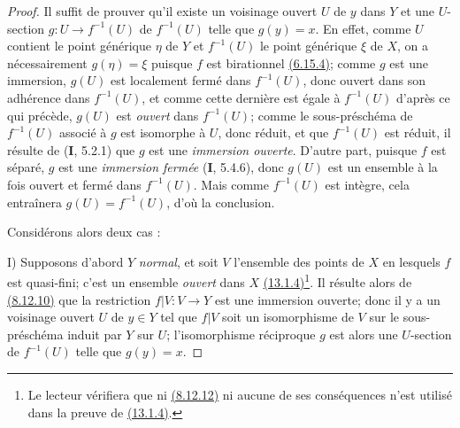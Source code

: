 \begin{proof}
Il suffit de prouver qu'il existe un voisinage ouvert $U$ de $y$ dans
$Y$ et une $U$-section $g:U\to f^{-1}(U)$ de $f^{-1}(U)$ telle que
$g(y)=x$. En effet, comme $U$ contient le point générique $\eta$ de
$Y$ et $f^{-1}(U)$ le point générique $\xi$ de $X$, on a
nécessairement $g(\eta)=\xi$ puisque $f$ est birationnel
{\hyperref[canon-index.ega4.c04.statement.6-15-4]{(6.15.4)}}; comme $g$ est une
immersion, $g(U)$ est localement fermé dans $f^{-1}(U)$, donc ouvert
dans son adhérence dans $f^{-1}(U)$, et comme cette dernière est égale
à $f^{-1}(U)$ d'après ce qui précède, $g(U)$ est \emph{ouvert} dans
$f^{-1}(U)$; comme le sous-préschéma de $f^{-1}(U)$ associé à $g$ est
isomorphe à $U$, donc réduit, et que $f^{-1}(U)$ est réduit, il résulte
de (\textbf{I}, 5.2.1) que $g$ est une \emph{immersion ouverte}. D'autre part, puisque
$f$ est séparé, $g$ est une \emph{immersion fermée} (\textbf{I}, 5.4.6), donc $g(U)$
est un ensemble à la fois ouvert et fermé dans $f^{-1}(U)$. Mais comme
$f^{-1}(U)$ est intègre, cela entraînera $g(U)=f^{-1}(U)$, d'où la
conclusion.

Considérons alors deux cas :

\textup{I)} Supposons d'abord $Y$ \emph{normal}, et soit $V$ l'ensemble des
points de $X$ en lesquels $f$ est quasi-fini; c'est un ensemble \emph{ouvert}
dans $X$ {\hyperref[canon-index.ega4.c04.cor.13-1-4]{(13.1.4)}}\footnote{Le
lecteur vérifiera que ni {\hyperlink{ega4.c04.cor.8-12-12}{(8.12.12)}}
ni aucune de ses conséquences n'est utilisé dans la preuve de
{\hyperref[canon-index.ega4.c04.cor.13-1-4]{(13.1.4)}}.}. Il résulte alors de
{\hyperref[canon-index.ega4.c04.cor.8-12-10]{(8.12.10)}}
que la restriction $f|V:V\to Y$ est une immersion ouverte; donc il y a
un voisinage ouvert $U$ de $y\in Y$ tel que $f|V$ soit un isomorphisme
de $V$ sur le sous-préschéma induit par $Y$ sur $U$; l'isomorphisme
réciproque $g$ est alors une $U$-section de $f^{-1}(U)$ telle que
$g(y)=x$.


\end{proof}
